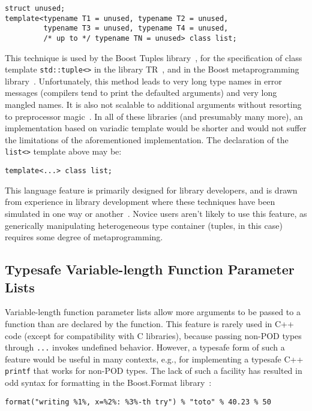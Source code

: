 \documentclass{article}
\begin{document}
\begin{verbatim}
struct unused;
template<typename T1 = unused, typename T2 = unused, 
         typename T3 = unused, typename T4 = unused, 
         /* up to */ typename TN = unused> class list;
\end{verbatim}

This technique is used by the Boost Tuples library~\cite{Tuples01},
for the specification of class template {\tt std::tuple<>} in the
library TR~\cite{Jarvi02}, and in the Boost metaprogramming
library~\cite{Gurtovoy02}. Unfortunately, this method leads to very
long type names in error messages (compilers tend to print the
defaulted arguments) and very long mangled names. It is also not
scalable to additional arguments without resorting to preprocessor
magic~\cite{Preprocessor01}. In all of these libraries (and presumably
many more), an implementation based on variadic template would be
shorter and would not suffer the limitations of the aforementioned
implementation. The declaration of the {\tt list<>} template above may
be:
\begin{verbatim}
template<...> class list;
\end{verbatim}

This language feature is primarily designed for library developers,
and is drawn from experience in library development where these
techniques have been simulated in one way or
another~\cite{Gurtovoy02,Lambda02,Tuples01,Function01,Bind01}. Novice
users aren't likely to use this feature, as generically manipulating
heterogeneous type container (tuples, in this case) requires some
degree of metaprogramming.

\subsection{Typesafe Variable-length Function Parameter Lists}
Variable-length function parameter lists allow more arguments to be
passed to a function than are declared by the function. This feature
is rarely used in C++ code (except for compatibility with C
libraries), because passing non-POD types through {\tt ...} invokes
undefined behavior. However, a typesafe form of such a feature would
be useful in many contexts, e.g., for implementing a typesafe C++ {\tt
  printf} that works for non-POD types. The lack of such a facility
has resulted in odd syntax for formatting in the Boost.Format
library~\cite{Krempp02}:
\begin{verbatim}
format("writing %1%, x=%2%: %3%-th try") % "toto" % 40.23 % 50
\end{verbatim}
\end{document}
